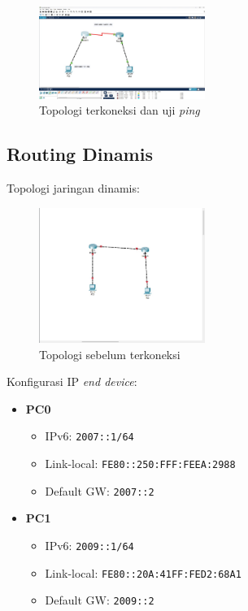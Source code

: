 \begin{figure}[H]
    \centering
    \includegraphics[width=0.48\textwidth]{img/TM4.jpeg}
    \caption{Topologi terkoneksi dan uji \textit{ping}}
    \label{fig:tm4}
\end{figure}

\newpage
\subsection{Routing Dinamis}

Topologi jaringan dinamis:

\begin{figure}[H]
    \centering
    \includegraphics[width=0.48\textwidth]{img/TM5.jpeg}
    \caption{Topologi sebelum terkoneksi}
    \label{fig:tm5}
\end{figure}

Konfigurasi IP \textit{end device}:
\begin{itemize}
    \item \textbf{PC0}
        \begin{itemize}
            \item IPv6: \texttt{2007::1/64}
            \item Link-local: \texttt{FE80::250:FFF:FEEA:2988}
            \item Default GW: \texttt{2007::2}
        \end{itemize}
    \item \textbf{PC1}
        \begin{itemize}
            \item IPv6: \texttt{2009::1/64}
            \item Link-local: \texttt{FE80::20A:41FF:FED2:68A1}
            \item Default GW: \texttt{2009::2}
        \end{itemize}
\end{itemize}

